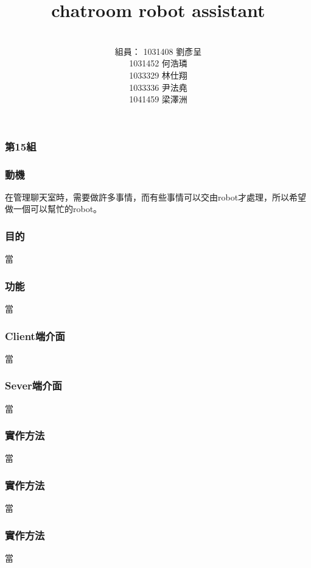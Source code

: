 \documentclass[utf8x]{beamer}
\title[Short title]{\Huge chatroom robot assistant} %
\author{\\  \hspace{-3em}組員： 1031408 劉彥呈 \\ 1031452 何浩璘 \\ 1033329 林仕翔 \\ 1033336 尹法堯 \\ 1041459 梁澤洲} %
\date{} %
\begin{document}
\begin{frame}
\frametitle{\huge 第15組} %
\titlepage %
\end{frame}
\begin{frame}[t]
\frametitle{\huge  動機} %
\vspace{2em}
\hspace{1em} \Large 在管理聊天室時，需要做許多事情，而有些事情可以交由robot才處理，所以希望做一個可以幫忙的robot。
\end{frame}

\begin{frame}[t]
\frametitle{\huge  目的} %
\hspace{2em} \Large 當
\end{frame}
\begin{frame}[t]
\frametitle{\huge 功能} %
\hspace{2em} \Large 當
\end{frame}

\begin{frame}[t]
\frametitle{\huge Client端介面} %
\hspace{2em} \Large 當
\end{frame}

\begin{frame}[t]
\frametitle{\huge Sever端介面} %
\hspace{2em} \Large 當
\end{frame}
\begin{frame}[t]
\frametitle{\LARGE 實作方法} %
\hspace{2em} \Large 當
\end{frame}

\begin{frame}[t]
\frametitle{\LARGE 實作方法} %
\hspace{2em} \Large 當
\end{frame}

\begin{frame}[t]
\frametitle{\LARGE 實作方法} %
\hspace{2em} \Large 當
\end{frame}
\end{document}
